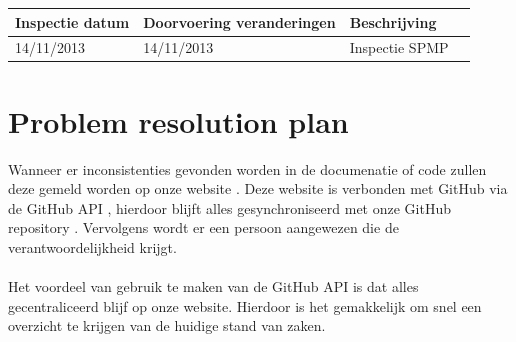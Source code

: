\begin{center}
    \begin{tabular}{| l | l | l | l |}
    \hline
    Inspectie datum & Doorvoering veranderingen & Beschrijving \\ \hline
    14/11/2013 & 14/11/2013 & Inspectie SPMP \\ \hline
    
    \end{tabular}
\end{center}


\section{Problem resolution plan}
Wanneer er inconsistenties gevonden worden in de documenatie of code zullen deze gemeld worden op onze website \cite{portalWebsite}. Deze website is verbonden met GitHub via de GitHub API \cite{GitHubAPI}, hierdoor blijft alles gesynchroniseerd met onze GitHub repository \cite{GitHubRepository}. Vervolgens wordt er een persoon aangewezen die de verantwoordelijkheid krijgt.
\\
\\
Het voordeel van gebruik te maken van de GitHub API is dat alles gecentraliceerd blijf op onze website. Hierdoor is het gemakkelijk om snel een overzicht te krijgen van de huidige stand van zaken.

